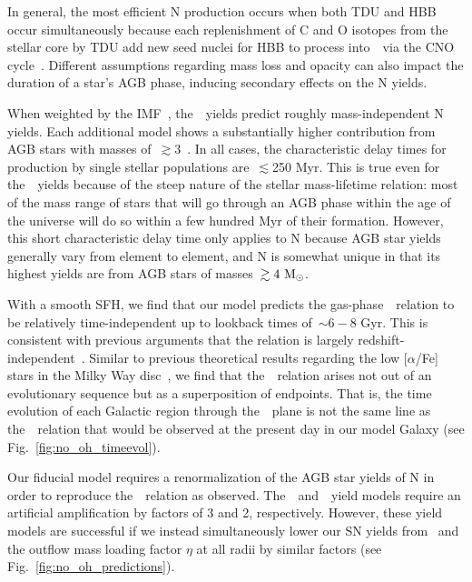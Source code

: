 \documentclass[ms.tex]{subfiles}
\begin{document}
In general, the most efficient N production occurs when both TDU and HBB
occur simultaneously because each replenishment of C and O isotopes from the
stellar core by TDU add new seed nuclei for HBB to process into~\Nfourteen~via
the CNO cycle~\citep{Ventura2013}.
Different assumptions regarding mass loss and opacity can also impact the
duration of a star's AGB phase, inducing secondary effects on the N yields.
\par
When weighted by the IMF~\citep{Kroupa2001}, the~\cristallo~yields predict
roughly mass-independent N yields.
Each additional model shows a substantially higher contribution from AGB stars
with masses of~$\gtrsim$3~\msun.
In all cases, the characteristic delay times for production by single stellar
populations are~$\lesssim$250 Myr.
This is true even for the~\cristallo~yields because of the steep nature of the
stellar mass-lifetime relation: most of the mass range of stars that will go
through an AGB phase within the age of the universe will do so within a few
hundred Myr of their formation.
However, this short characteristic delay time only applies to N because AGB
star yields generally vary from element to element, and N is somewhat unique
in that its highest yields are from AGB stars of masses~$\gtrsim 4~\text{M}_\odot$.
\par
With a smooth SFH, we find that our model predicts the gas-phase~\ohno~relation
to be relatively time-independent up to lookback times of~$\sim6 - 8$ Gyr.
This is consistent with previous arguments that the relation is largely
redshift-independent~\citep{Vincenzo2018, HaydenPawson2021}.
Similar to previous theoretical results regarding the low [$\alpha$/Fe] stars
in the Milky Way disc~\citep[e.g.][]{Schoenrich2009, Nidever2014, Buck2020,
Sharma2021, Johnson2021}, we find that the~\ohno~relation arises not out of an
evolutionary sequence but as a superposition of endpoints.
That is, the time evolution of each Galactic region through the~\ohno~plane
is not the same line as the~\ohno~relation that would be observed at the
present day in our model Galaxy (see Fig.~\ref{fig:no_oh_timeevol}).
\par
Our fiducial model requires a renormalization of the AGB star yields of N in
order to reproduce the~\ohno~relation as observed.
The~\cristallo~and~\ventura~yield models require an artificial amplification by
factors of 3 and 2, respectively.
However, these yield models are successful if we instead simultaneously lower
our SN yields from~\citet{Johnson2021} and the outflow mass loading factor
$\eta$ at all radii by similar factors (see Fig.~\ref{fig:no_oh_predictions}).
\end{document}
